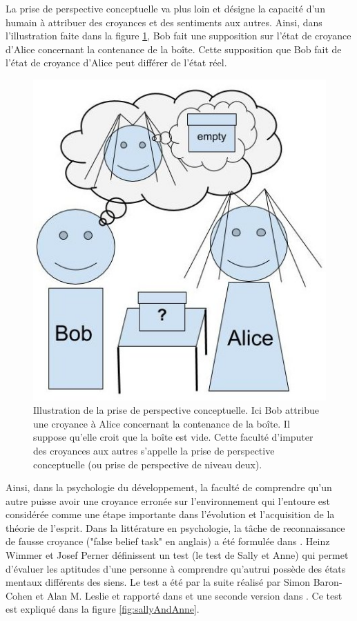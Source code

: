 \documentclass[a4paper,11pt,twoside]{StyleThese}
\begin{document}
La prise de perspective conceptuelle va plus loin et désigne la capacité d'un humain à attribuer des croyances et des sentiments aux autres\cite{Baron1985}.
Ainsi, dans l'illustration faite dans la figure \ref{fig:conceptual}, Bob fait une supposition sur l'état de croyance d'Alice concernant la contenance de la boîte.
Cette supposition que Bob fait de l'état de croyance d'Alice peut différer de l'état réel.

\begin{figure}[ht!]
 \centering
  \includegraphics[width=0.49\linewidth]{./img/conceptual.jpg} 
  \caption {Illustration de la prise de perspective conceptuelle. Ici Bob attribue une croyance à Alice concernant la contenance de la boîte. Il suppose qu'elle croit que la boîte est vide. Cette faculté d'imputer des croyances aux autres s'appelle la prise de perspective conceptuelle (ou prise de perspective de niveau deux).}
  \label{fig:conceptual}
\end{figure}

Ainsi, dans la psychologie du développement, la faculté de comprendre qu'un autre puisse avoir une croyance erronée sur l'environnement qui l'entoure est considérée comme une étape importante dans l'évolution et l'acquisition de la théorie de l'esprit. Dans la littérature en psychologie, la tâche de reconnaissance de fausse croyance ("false belief task" en anglais) a été formulée dans \cite{Wimmer1983103}. Heinz Wimmer et Josef Perner définissent un test (le test de Sally et Anne) qui permet d'évaluer les aptitudes d'une personne à comprendre qu'autrui possède des états mentaux différents des siens. Le test a été par la suite réalisé par Simon Baron-Cohen et Alan M. Leslie et rapporté dans \cite{Baron1985} et une seconde version dans \cite{Leslie1988}. Ce test est expliqué dans la figure \ref{fig:sallyAndAnne}.
\end{document}
